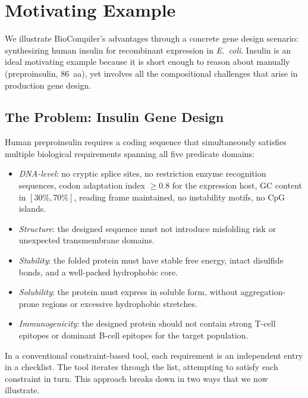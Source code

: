 \section{Motivating Example}\label{sec:motivating}

We illustrate BioCompiler's advantages through a concrete gene design
scenario: synthesizing human insulin for recombinant expression in
\emph{E.~coli}.
Insulin is an ideal motivating example because it is short enough to
reason about manually (preproinsulin, 86~aa), yet involves all the
compositional challenges that arise in production gene design.

\subsection{The Problem: Insulin Gene Design}

Human preproinsulin requires a coding sequence that simultaneously
satisfies multiple biological requirements spanning all five predicate
domains:
\begin{itemize}[leftmargin=*,itemsep=0pt,topsep=1pt]
\item \emph{DNA-level}: no cryptic splice sites, no restriction
      enzyme recognition sequences, codon adaptation index $\ge 0.8$
      for the expression host, GC content in $[30\%, 70\%]$, reading
      frame maintained, no instability motifs, no CpG islands.
\item \emph{Structure}: the designed sequence must not introduce
      misfolding risk or unexpected transmembrane domains.
\item \emph{Stability}: the folded protein must have stable free
      energy, intact disulfide bonds, and a well-packed hydrophobic
      core.
\item \emph{Solubility}: the protein must express in soluble form,
      without aggregation-prone regions or excessive hydrophobic
      stretches.
\item \emph{Immunogenicity}: the designed protein should not contain
      strong T-cell epitopes or dominant B-cell epitopes for the
      target population.
\end{itemize}

\noindent In a conventional constraint-based tool, each requirement is
an independent entry in a checklist.
The tool iterates through the list, attempting to satisfy each
constraint in turn.
This approach breaks down in two ways that we now illustrate.

